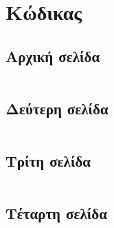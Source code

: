 \documentclass[a4paper,9pt]{article}
\begin{document}
\pagebreak

\section{Κώδικας}
\subsection{Αρχική σελίδα}
\inputminted[linenos,fontsize=\scriptsize]{html}{files/index.html}
\subsection{Δεύτερη σελίδα}
\inputminted[linenos,fontsize=\scriptsize]{jsp}{files/continent.jsp}
\subsection{Τρίτη σελίδα}
\inputminted[linenos,fontsize=\scriptsize]{jsp}{files/booking.jsp}
\subsection{Τέταρτη σελίδα}
\inputminted[linenos,fontsize=\scriptsize]{jsp}{files/final.jsp}
\end{document}
